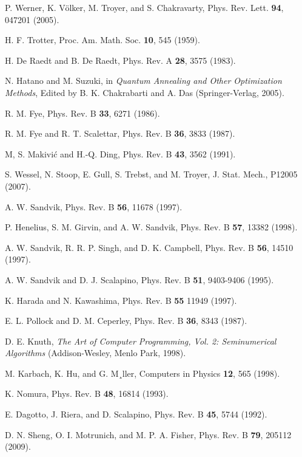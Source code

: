 \documentclass[draft,numberedheadings]{aipproc}
\begin{document}
\begin{thebibliography}{999}
P. Werner, K. V\"olker, M. Troyer, and S. Chakravarty, Phys. Rev. Lett. {\bf 94}, 047201 (2005). 

H. F. Trotter, Proc. Am. Math. Soc. {\bf 10}, 545 (1959).

H. De Raedt and B. De Raedt, Phys. Rev. A {\bf 28}, 3575 (1983).

N. Hatano and M. Suzuki, in {\it Quantum Annealing and Other Optimization Methods}, Edited by B. K. Chakrabarti and A. Das (Springer-Verlag, 2005).

R. M. Fye, Phys. Rev. B {\bf 33}, 6271 (1986).

R. M. Fye and R. T. Scalettar, Phys. Rev. B {\bf 36}, 3833 (1987).

M, S. Makivi\'c and H.-Q. Ding, Phys. Rev. B {\bf 43}, 3562 (1991).

S. Wessel, N. Stoop, E. Gull, S. Trebst, and M. Troyer, J. Stat. Mech., P12005 (2007).

A. W. Sandvik, Phys. Rev. B {\bf 56}, 11678 (1997).

P. Henelius, S. M. Girvin, and A. W. Sandvik, Phys. Rev. B {\bf 57}, 13382 (1998).

A. W. Sandvik, R. R. P. Singh, and D. K. Campbell, Phys. Rev. B {\bf 56}, 14510 (1997).

A. W. Sandvik and D. J. Scalapino, Phys. Rev. B {\bf 51}, 9403-9406 (1995).

K. Harada and N. Kawashima, Phys. Rev. B {\bf 55} 11949 (1997).

E. L. Pollock and D. M. Ceperley, Phys. Rev. B {\bf 36}, 8343 (1987).

D. E. Knuth, {\it The Art of Computer Programming, Vol. 2: Seminumerical Algorithms} (Addison-Wesley, 
Menlo Park, 1998).

M. Karbach, K. Hu, and G. M¸ller, Computers in Physics {\bf 12}, 565 (1998).

K. Nomura, Phys. Rev. B {\bf 48}, 16814 (1993).

E. Dagotto, J. Riera, and D. Scalapino, Phys. Rev. B {\bf 45}, 5744 (1992). 

D. N. Sheng, O. I. Motrunich, and M. P. A. Fisher, Phys. Rev. B {\bf 79}, 205112 (2009). 


\end{thebibliography}
\end{document}
